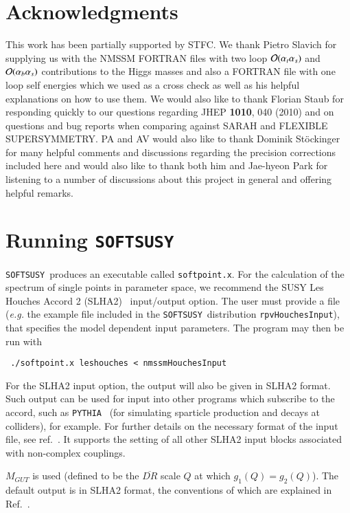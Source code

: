 \documentclass[final,3p,times,pdflatex]{elsarticle}
\def\SOFTSUSY{{\tt SOFTSUSY}}
\def\code#1{\small{\tt #1}\normalsize}
\def\at{\alpha_t}
\def\ab{\alpha_b}
\def\as{\alpha_s}
\def\oatas{{\cal O}(\at\as)}
\def\oabas{{\cal O}(\ab\as)}
\begin{document}
\section*{Acknowledgments}
This work has been partially supported by STFC\@. We thank Pietro
Slavich for supplying us with the NMSSM FORTRAN files with two loop
$\oatas$ and $\oabas$ contributions to the Higgs masses and also a
FORTRAN file with one loop self energies which we used as a cross
check as well as his helpful explanations on how to use them. We would
also like to thank Florian Staub for responding quickly to our questions
regarding JHEP {\bf 1010}, 040 (2010) and on questions and bug reports
when comparing against SARAH and FLEXIBLE SUPERSYMMETRY. PA and AV
would also like to thank Dominik St\"ockinger for many helpful
comments and discussions regarding the precision corrections included
here and would also like to thank both him and Jae-hyeon Park for
listening to a number of discussions about this project in general and
offering helpful remarks.


\appendix

\section{Running \SOFTSUSY}
\label{sec:run}

\SOFTSUSY~produces an executable called \code{softpoint.x}. For the calculation
of the spectrum of single points in parameter space, we recommend the
SUSY Les Houches Accord 2 (SLHA2)~\cite{Allanach:2008qq}  input/output
option. The user must provide a file (\textit{e.g.} the example file included
in the \SOFTSUSY~distribution
\code{rpvHouchesInput}), that specifies the model dependent input
parameters. The program may then be run with
\small
\begin{verbatim}
 ./softpoint.x leshouches < nmssmHouchesInput
\end{verbatim}
\normalsize
For the SLHA2 input option, 
the output will also be given in 
SLHA2 format. Such output can be used for
input into other programs which subscribe to the accord, such as
\code{PYTHIA}~\cite{Sjostrand:2007gs} (for
simulating sparticle production and decays at colliders), for example. For
further details on the necessary format of 
the input file, see ref.~\cite{Allanach:2008qq}. It supports 
the setting of all other SLHA2 input blocks associated with non-complex
couplings. 

$M_{GUT}$ is used (defined to be the $\overline{DR}$ scale $Q$ at which $g_1(Q) =
g_2(Q)$). The default output is in SLHA2 format, the conventions of which are
explained in Ref.~\cite{Allanach:2008qq}. 
\end{document}
